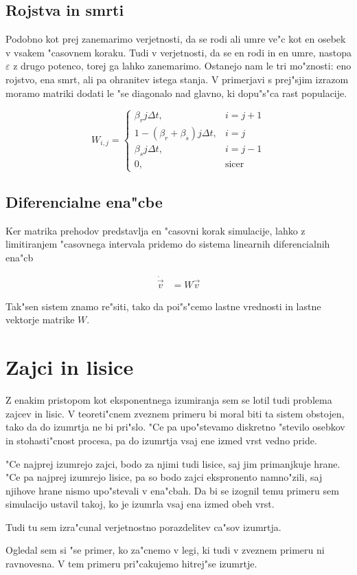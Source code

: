 \documentclass[a4paper,10pt]{article}
\newcommand{\eps}{\varepsilon}
\begin{document}
\subsection{Rojstva in smrti}

Podobno kot prej zanemarimo verjetnosti, da se rodi ali umre ve"c kot en osebek v vsakem "casovnem koraku. Tudi v verjetnosti, da se en rodi in en umre, nastopa $\eps$ z drugo potenco, torej ga lahko zanemarimo. Ostanejo nam le tri mo"znosti: eno rojstvo, ena smrt, ali pa ohranitev istega stanja. V primerjavi s prej"sjim izrazom moramo matriki dodati le "se diagonalo nad glavno, ki dopu"s"ca rast populacije. 

\begin{equation}
  W_{i,j} = \left\{ \begin{matrix} 
                      \beta_r j \Delta t, & i=j+1 \\
		      1 - (\beta_r+\beta_s) j \Delta t, & i=j \\
                      \beta_s j \Delta t, & i=j-1 \\
		      0, & \mathrm{sicer}
                    \end{matrix}\right.
\end{equation}

\subsection{Diferencialne ena"cbe}

Ker matrika prehodov predstavlja en "casovni korak simulacije, lahko z limitiranjem "casovnega intervala pridemo do sistema linearnih diferencialnih ena"cb

\begin{align}
  \dot {\vec v} &= W \vec v
\end{align}

Tak"sen sistem znamo re"siti, tako da poi"s"cemo lastne vrednosti in lastne vektorje matrike $W$. 

\section{Zajci in lisice}

Z enakim pristopom kot eksponentnega izumiranja sem se lotil tudi problema zajcev in lisic. V teoreti"cnem zveznem primeru bi moral biti ta sistem obstojen, tako da do izumrtja ne bi pri"slo. "Ce pa upo"stevamo diskretno "stevilo osebkov in stohasti"cnost procesa, pa do izumrtja vsaj ene izmed vrst vedno pride. 

"Ce najprej izumrejo zajci, bodo za njimi tudi lisice, saj jim primanjkuje hrane. "Ce pa najprej izumrejo lisice, pa so bodo zajci ekspronento namno"zili, saj njihove hrane nismo upo"stevali v ena"cbah. Da bi se izognil temu primeru sem simulacijo ustavil takoj, ko je izumrla vsaj ena izmed obeh vrst. 

Tudi tu sem izra"cunal verjetnostno porazdelitev ca"sov izumrtja. 



Ogledal sem si "se primer, ko za"cnemo v legi, ki tudi v zveznem primeru ni ravnovesna. V tem primeru pri"cakujemo hitrej"se izumrtje. 



\end{document}
